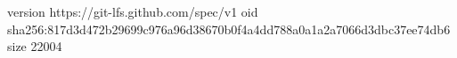 version https://git-lfs.github.com/spec/v1
oid sha256:817d3d472b29699c976a96d38670b0f4a4dd788a0a1a2a7066d3dbc37ee74db6
size 22004
